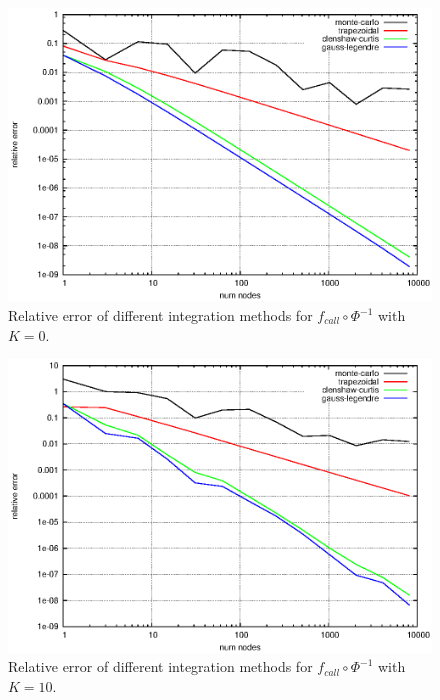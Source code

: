\documentclass[]{article}
\begin{document}
\begin{figure}[!ht]
\centering
\includegraphics{task10Plot_0}
\caption{Relative error of different integration methods for
$f_{call}\circ \Phi^{-1}$ with $K = 0$.}
\label{fig:Task10_0}
\end{figure}

\begin{figure}[!ht]
\centering
\includegraphics{task10Plot_10}
\caption{Relative error of different integration methods for
$f_{call}\circ \Phi^{-1}$ with $K = 10$.}
\label{fig:Task10_10}
\end{figure}
\end{document}
